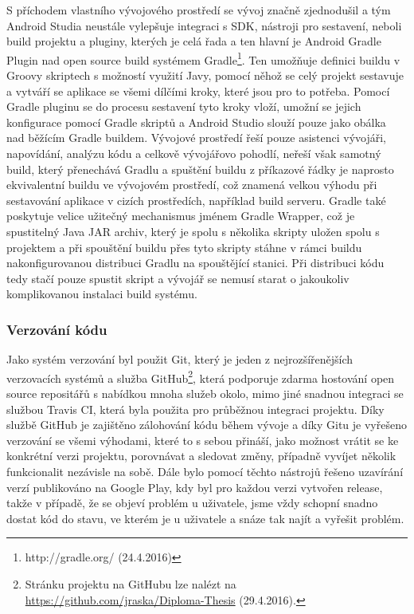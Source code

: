 \documentclass[czech,master,public,dept460,male,java,cpdeclaration]{diploma}
\begin{document}
S příchodem vlastního vývojového prostředí se vývoj značně zjednodušil a tým Android Studia neustále vylepšuje integraci s SDK,
nástroji pro sestavení, neboli build projektu a pluginy, kterých je celá řada a ten hlavní je Android Gradle Plugin
nad open source build systémem Gradle\footnote{http://gradle.org/ (24.4.2016)}. Ten umožňuje definici buildu v Groovy skriptech s možností využití Javy,
 pomocí něhož se celý projekt sestavuje a vytváří se aplikace se všemi dílčími kroky, které jsou pro to potřeba.
Pomocí Gradle pluginu se do procesu sestavení tyto kroky vloží, umožní se jejich konfigurace pomocí Gradle skriptů
a Android Studio slouží pouze jako obálka nad běžícím Gradle buildem. Vývojové prostředí řeší pouze asistenci vývojáři,
napovídání, analýzu kódu a celkově vývojářovo pohodlí, neřeší však samotný build, který přenechává Gradlu a spuštění buildu
 z příkazové řádky je naprosto ekvivalentní buildu ve vývojovém prostředí, což znamená velkou výhodu při sestavování aplikace
 v cizích prostředích, například build serveru.
 Gradle také poskytuje velice užitečný mechanismus jménem Gradle Wrapper, což je spustitelný Java JAR archiv,
 který je spolu s několika skripty uložen spolu s projektem a při spouštění buildu přes tyto skripty stáhne v rámci
 buildu nakonfigurovanou distribuci Gradlu na spouštějící stanici. Při distribuci kódu tedy stačí pouze spustit
 skript a vývojář se nemusí starat o jakoukoliv komplikovanou instalaci build systému.

 \subsubsection{Verzování kódu}
 Jako systém verzování byl použit Git, který je jeden z nejrozšířenějších verzovacích systémů a služba
 GitHub\footnote{Stránku projektu na GitHubu lze nalézt na
        \url{https://github.com/jraska/Diploma-Thesis} (29.4.2016).},
 která podporuje zdarma hostování open source repositářů s nabídkou mnoha služeb okolo, mimo jiné snadnou integraci se službou
 Travis CI, která byla použita pro průběžnou integraci projektu. Díky službě GitHub je zajištěno zálohování kódu
 během vývoje a díky Gitu je vyřešeno verzování se všemi výhodami, které to s sebou přináší, jako možnost vrátit se
 ke konkrétní verzi projektu, porovnávat a sledovat změny, případně vyvíjet několik funkcionalit nezávisle na sobě.
 Dále bylo pomocí těchto nástrojů řešeno uzavírání verzí publikováno na Google Play, kdy byl pro každou verzi vytvořen
 release, takže v případě, že se objeví problém u uživatele, jsme vždy schopní snadno dostat kód do stavu,
 ve kterém je u uživatele a snáze tak najít a vyřešit problém.
\end{document}
